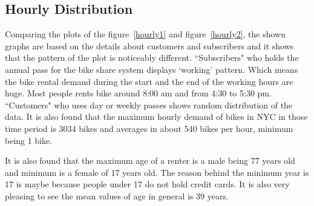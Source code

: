 \subsection {Hourly Distribution}
\label{hourly}


Comparing the plots of the figure~\ref{hourly1} and figure~\ref{hourly2}, the shown graphs are based on the details about customers and subscribers and it shows that the pattern of the plot is noticeably different. ``Subscribers" who holds the annual pass for the bike share system displays `working' pattern. Which means the bike rental demand during the start and the end of the working hours are huge. Most people rents bike around 8:00 am and from 4:30 to 5:30 pm. ``Customers" who uses day or weekly passes shows random distribution of the data. It is also found that the maximum hourly demand of bikes in NYC in those time period is 3034 bikes and averages in about 540 bikes per hour, minimum being 1 bike.   

It is also found that the maximum age of a renter is a male being 77 years old and minimum is a female of 17 years old. The reason behind the minimum year is 17 is maybe because people under 17 do not hold credit cards. It is also very pleasing to see the mean values of age in general is 39 years. 



\begin{figure}
\centering
{}
\end{figure}



